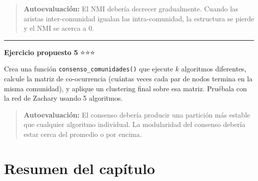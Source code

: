 \documentclass[
  letterpaper,
  DIV=11,
  numbers=noendperiod]{scrreprt}
\begin{document}
\begin{quote}
\textbf{Autoevaluación:} El NMI debería decrecer gradualmente. Cuando
las aristas inter-comunidad igualan las intra-comunidad, la estructura
se pierde y el NMI se acerca a 0.
\end{quote}

\begin{center}\rule{0.5\linewidth}{0.5pt}\end{center}

\textbf{Ejercicio propuesto 5} ⭐⭐⭐

Crea una función \texttt{consenso\_comunidades()} que ejecute \(k\)
algoritmos diferentes, calcule la matriz de co-ocurrencia (cuántas veces
cada par de nodos termina en la misma comunidad), y aplique un
clustering final sobre esa matriz. Pruébala con la red de Zachary usando
5 algoritmos.

\begin{quote}
\textbf{Autoevaluación:} El consenso debería producir una partición más
estable que cualquier algoritmo individual. La modularidad del consenso
debería estar cerca del promedio o por encima.
\end{quote}

\section{Resumen del capítulo}\label{resumen-del-capuxedtulo-6}
\end{document}
